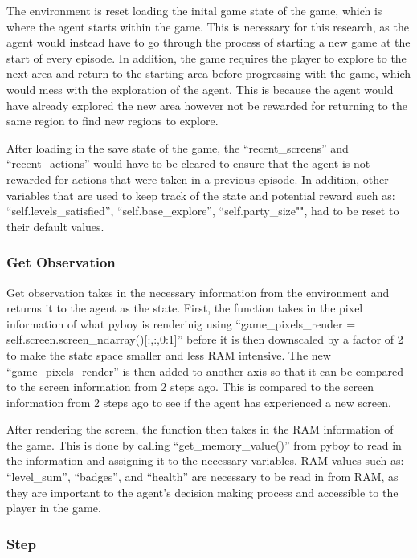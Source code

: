 The environment is reset loading the inital game state of the game, which is where the agent starts within the game. This is necessary for this research, as the agent would instead have to go through the process of starting a new game at the start of every episode. In addition, the game requires the player to explore to the next area and return to the starting area before progressing with the game, which would mess with the exploration of the agent. This is because the agent would have already explored the new area however not be rewarded for returning to the same region to find new regions to explore.

After loading in the save state of the game, the ``recent\_screens'' and ``recent\_actions'' would have to be cleared to ensure that the agent is not rewarded for actions that were taken in a previous episode. In addition, other variables that are used to keep track of the state and potential reward such as: ``self.levels\_satisfied'', ``self.base\_explore'', ``self.party\_size"", had to be reset to their default values. 

\subsubsection*{Get Observation}

Get observation takes in the necessary information from the environment and returns it to the agent as the state. First, the function takes in the pixel information of what pyboy is renderinig using ``game\_pixels\_render = self.screen.screen\_ndarray()[:,:,0:1]'' before it is then downscaled by a factor of 2 to make the state space smaller and less RAM intensive. The new ``game\=\_pixels\_render'' is then added to another axis so that it can be compared to the screen information from 2 steps ago. This is compared to the screen information from 2 steps ago to see if the agent has experienced a new screen.

After rendering the screen, the function then takes in the RAM information of the game. This is done by calling ``get\_memory\_value()'' from pyboy to read in the information and assigning it to the necessary variables. RAM values such as: ``level\_sum'', ``badges'', and ``health'' are necessary to be read in from RAM, as they are important to the agent's decision making process and accessible to the player in the game.

\subsubsection*{Step}

